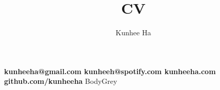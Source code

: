 \documentclass{article}
\renewcommand{\maketitle}{
  {\noindent\rmfamily\Huge\bfseries\MakeUppercase\theauthor}
  \vspace{.8em}
  }
\newcommand{\contacts}[5]{
  {\noindent\rmfamily\small\color{BodyGrey}\bfseries
    {\color{LightGrey}\faEnvelope}\hspace{5pt}#1\hspace{12pt}   %
    {\color{LightGrey}\faBriefcase}\hspace{5pt}#2\hspace{12pt}   %
    {\color{LightGrey}\faLink}\hspace{5pt}#3\hspace{12pt}       %
    {\color{LightGrey}\faGithub}\hspace{5pt}#4\hspace{12pt}     %
  }
}
\begin{document}

  \title{CV}
  \author{Kunhee Ha}

  \maketitle

\contacts
  {kunheeha@gmail.com}
  {kunheeh@spotify.com}
  {kunheeha.com}
  {github.com/kunheeha}

\color{BodyGrey}
\end{document}
